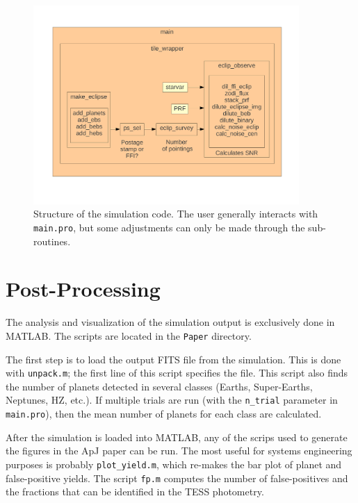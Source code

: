 \documentclass[preprint,10pt]{aastex}
\begin{document}
\begin{figure}
\begin{center}
\includegraphics[width=0.9\textwidth]{flow.pdf}
\end{center}
\caption{Structure of the simulation code. The user generally interacts with \texttt{main.pro}, but some adjustments can only be made through the sub-routines.}
\label{fig:flow}
\end{figure}

\section{Post-Processing}
The analysis and visualization of the simulation output is exclusively done in MATLAB. The scripts are located in the \texttt{Paper} directory.

The first step is to load the output FITS file from the simulation. This is done with \texttt{unpack.m}; the first line of this script specifies the file. This script also finds the number of planets detected in several classes (Earths, Super-Earths, Neptunes, HZ, etc.). If multiple trials are run (with the \texttt{n\_trial} parameter in \texttt{main.pro}), then the mean number of planets for each class are calculated.

After the simulation is loaded into MATLAB, any of the scrips used to generate the figures in the ApJ paper can be run. 
The most useful for systems engineering purposes is probably \texttt{plot\_yield.m}, which re-makes the bar plot of planet and false-positive yields. The script \texttt{fp.m} computes the number of false-positives and the fractions that can be identified in the TESS photometry.
\end{document}
